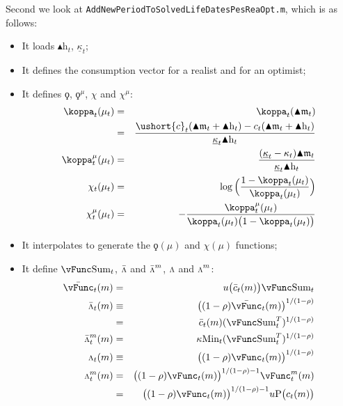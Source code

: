\documentclass[titlepage,abstract]{\econtex}
\providecommand{\kappaMin}{\kappa\text{Min}}
\providecommand{\vSum}{\vFunc\text{Sum}}
\providecommand{\Deltah}{\blacktriangle \mathrm{h}}
\providecommand{\Deltam}{\blacktriangle \mathfrak{m}}
\providecommand{\vInv}{\ensuremath{\scriptstyle \Lambda \displaystyle}}
\begin{document}
Second we look at \texttt{AddNewPeriodToSolvedLifeDatesPesReaOpt.m}, which is as follows:
        \begin{itemize}
        \item It loads $\Deltah_{t}$, $\underline{\kappa}_{t}$;
        \item It defines the consumption vector for a realist and for an optimist;
        \item It defines $\ensuremath{\koppa}$, $\ensuremath{\koppa}^{\mu}$, $\chi$ and $\chi^{\mu}$:
            \begin{eqnarray}
            \koppa_{t} (\mu_{t}) &=& \koppa_{t} (\Deltam_{t}) \\
            &=& \frac{\ushort{c}_{t}(\Deltam_{t} + \Deltah_{t})-c_{t}(\Deltam_{t} + \Deltah _{t})}{\underline{\kappa}_{t} \Deltah_{t}} \\
            \koppa_{t}^{\mu} (\mu_{t}) &=& \frac{(\underline{\kappa}_{t}-\kappa_{t}) \Deltam_{t}}{\underline{\kappa}_{t} \Deltah_{t}} \\
            \chi_{t} (\mu_{t}) &=& \log\Big(\frac{1-\koppa_{t} (\mu_{t})}{\koppa_{t} (\mu_{t}) }\Big) \\
            \chi_{t}^{\mu} (\mu_{t}) &=& -\frac{\koppa_{t}^{\mu}(\mu_{t})}{\koppa_{t} (\mu_{t})\big(1-\koppa_{t} (\mu_{t})\big)}
            \end{eqnarray}
        \item It interpolates to generate the $\ensuremath{\koppa}(\mu)$ and $\chi(\mu)$ functions;
        \item It define $\vSum_{t}$, $\bar{\vInv}$ and $\bar{\vInv}^{m}$, $\vInv$ and $\vInv^{m}$:
            \begin{eqnarray}
            \bar{\vFunc}_{t} (m) &=& u\big(\bar{c}_{t}(m)\big) \vSum_{t} \\
            \bar{\vInv}_{t} (m) &\equiv&
            \big((1-\rho)\bar{\vFunc}_{t} (m)\big)^{1/(1-\rho)} \\
            &=&\bar{c}_{t}(m) (\vSum_{t}^{T})^{1/(1-\rho)} \\
            \bar{\vInv}_{t}^{m} (m) &=&
            \kappaMin_{t} (\vSum_{t}^{T})^{1/(1-\rho)} \\
            \vInv_{t} (m) &\equiv&
            \big((1-\rho)\vFunc_{t} (m)\big)^{1/(1-\rho)} \\
            \vInv_{t}^{m} (m) &=&
            \big((1-\rho)\vFunc_{t} (m)\big)^{1/(1-\rho)-1} \vFunc_{t}^{m} (m)\\
            &=&
            \big((1-\rho)\vFunc_{t} (m)\big)^{1/(1-\rho)-1} u\text{P}\big(c_{t}(m)\big) \\
            \end{eqnarray}


\end{itemize}
\end{document}
